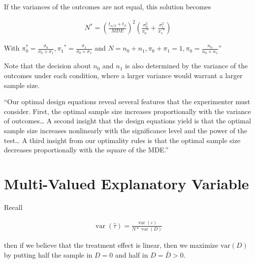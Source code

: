 \documentclass[10pt]{article}
\begin{document}
If the variances of the outcomes are not equal, this solution becomes

\begin{align}
    N^*=\left(\frac{t_{\alpha / 2}+t_\beta}{M D E}\right)^2\left(\frac{\sigma_0^2}{\pi_0{ }^*}+\frac{\sigma_1^2}{\pi_1{ }^*}\right)
\end{align}

With $\pi_0^*=\frac{\sigma_0}{\sigma_0+\sigma_1}, \pi_1{ }^*=\frac{\sigma_1}{\sigma_0+\sigma_1}$ and $N=n_0+n_1, \pi_0+\pi_1=1, \pi_0=\frac{n_0}{n_0+n_1}$''

Note that the decision about $n_0$ and $n_1$ is also determined by 
the variance of the outcomes under each condition, where a 
larger variance would warrant a larger sample size.

``Our optimal design equations reveal several features that the experimenter 
must consider. First, the optimal sample size increases proportionally 
with the variance of outcomes\ldots
A second insight that the design equations yield is that the optimal sample size increases nonlinearly with the significance level and the power of the 
test\dots
A third insight from our optimality rules is 
that the optimal sample size decreases 
proportionally with the square of the MDE.'' 

\section{Multi-Valued Explanatory Variable}

Recall 

\begin{align}
    \operatorname{var}(\hat{\tau})=\frac{\operatorname{var}(\varepsilon)}{N * \operatorname{var}(D)}
\end{align}

then if we believe that the treatment effect is linear,
then we maximize $\text{var}(D)$ by putting half the sample 
in $D=0$ and half in $D = \bar{D} > 0$. 

 
\end{document}
